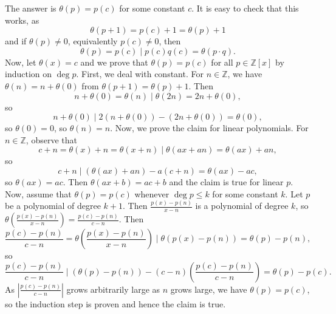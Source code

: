 The answer is $\theta\left(p\right)=p\left(c\right)$ for some constant $c$. It is easy to check that this works, as \[\theta\left(p+1\right)=p\left(c\right)+1=\theta\left(p\right)+1\] and if $\theta\left(p\right)\neq0$, equivalently $p\left(c\right)\neq0$, then \[\theta\left(p\right)=p\left(c\right)\mid p\left(c\right)q\left(c\right)=\theta\left(p\cdot q\right).\] Now, let $\theta\left(x\right)=c$ and we prove that $\theta\left(p\right)=p\left(c\right)$ for all $p\in\mathbb{Z}\left[x\right]$ by induction on $\deg p$. First, we deal with constant. For $n\in\mathbb{Z}$, we have $\theta\left(n\right)=n+\theta\left(0\right)$ from $\theta\left(p+1\right)=\theta\left(p\right)+1$. Then \[n+\theta\left(0\right)=\theta\left(n\right)\mid\theta\left(2n\right)=2n+\theta\left(0\right),\] so \[n+\theta\left(0\right)\mid2\left(n+\theta\left(0\right)\right)-\left(2n+\theta\left(0\right)\right)=\theta\left(0\right),\] so $\theta\left(0\right)=0$, so $\theta\left(n\right)=n$. Now, we prove the claim for linear polynomials. For $n\in\mathbb{Z}$, observe that \[c+n=\theta\left(x\right)+n=\theta\left(x+n\right)\mid\theta\left(ax+an\right)=\theta\left(ax\right)+an,\] so \[c+n\mid\left(\theta\left(ax\right)+an\right)-a\left(c+n\right)=\theta\left(ax\right)-ac,\] so $\theta\left(ax\right)=ac$. Then $\theta\left(ax+b\right)=ac+b$ and the claim is true for linear $p$. Now, assume that $\theta\left(p\right)=p\left(c\right)$ whenever $\deg p\leq k$ for some constant $k$. Let $p$ be a polynomial of degree $k+1$. Then $\frac{p\left(x\right)-p\left(n\right)}{x-n}$ is a polynomial of degree $k$, so $\theta\left(\frac{p\left(x\right)-p\left(n\right)}{x-n}\right)=\frac{p\left(c\right)-p\left(n\right)}{c-n}$. Then \[\frac{p\left(c\right)-p\left(n\right)}{c-n}=\theta\left(\frac{p\left(x\right)-p\left(n\right)}{x-n}\right)\mid\theta\left(p\left(x\right)-p\left(n\right)\right)=\theta\left(p\right)-p\left(n\right),\] so \[\frac{p\left(c\right)-p\left(n\right)}{c-n}\mid\left(\theta\left(p\right)-p\left(n\right)\right)-\left(c-n\right)\left(\frac{p\left(c\right)-p\left(n\right)}{c-n}\right)=\theta\left(p\right)-p\left(c\right).\] As $\left|\frac{p\left(c\right)-p\left(n\right)}{c-n}\right|$ grows arbitrarily large as $n$ grows large, we have $\theta\left(p\right)=p\left(c\right)$, so the induction step is proven and hence the claim is true.